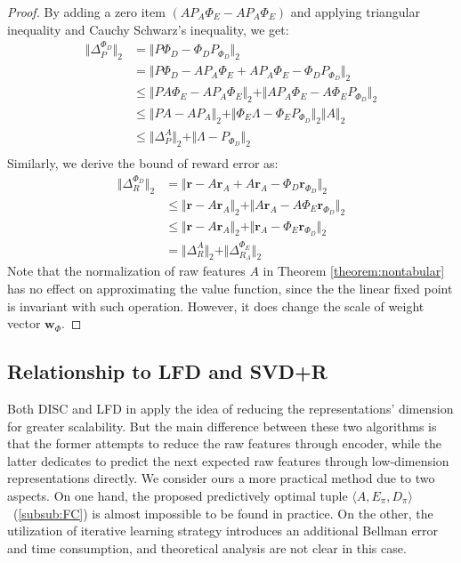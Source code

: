 \documentclass[onecolumn, conference]{IEEEtran}
\begin{document}
\begin{proof}
	 By adding a zero item $(AP_A\Phi_E - AP_A\Phi_E)$ and applying triangular inequality and Cauchy Schwarz's inequality, we get:
	 \begin{align*}
	 	\Vert \Delta_P^{\Phi_D}\Vert_2 & = \Vert P\Phi_D - \Phi_DP_{\Phi_D}\Vert_2\\
	 	& =  \Vert P\Phi_D - AP_A\Phi_E + AP_A\Phi_E - \Phi_DP_{\Phi_D}\Vert_2 \\
	 	& \le \Vert  PA\Phi_E - AP_A\Phi_E\Vert_2 + \Vert AP_A\Phi_E - A\Phi_E P_{\Phi_D}\Vert_2\\
	 	& \le \Vert PA -AP_A\Vert_2 + \Vert \Phi_E \Lambda - \Phi_E P_{\Phi_D}\Vert_2 \Vert A\Vert_2\\
	 	& \le  \Vert \Delta_P^A\Vert_2 + \Vert \Lambda - P_{\Phi_D}\Vert_2\\
	 \end{align*}
	 Similarly, we derive the bound of reward error as:
	 \begin{align*}
	 	\Vert \Delta_R^{\Phi_D}\Vert_2 &= \Vert \boldsymbol{r} - A\boldsymbol{r}_A +A\boldsymbol{r}_A - \Phi_D \boldsymbol{r}_{\Phi_D} \Vert_2\\
	 	&\le \Vert \boldsymbol{r} - A\boldsymbol{r}_A \Vert_2+\Vert A\boldsymbol{r}_A - A\Phi_E \boldsymbol{r}_{\Phi_D} \Vert_2\\
	 	&\le \Vert \boldsymbol{r} - A\boldsymbol{r}_A \Vert_2 + \Vert \boldsymbol{r}_A - \Phi_E \boldsymbol{r}_{\Phi_D} \Vert_2 \\
	 	& = \Vert \Delta_R^{A}\Vert_2 + \Vert \Delta_{R_A}^{\Phi_E} \Vert_2
	 \end{align*}
	 Note that the normalization of raw features $A$ in Theorem \ref{theorem:nontabular} has no effect on approximating the value function, since the the linear fixed point is invariant with such operation. However, it does change the scale of weight vector $\boldsymbol{w}_\Phi$.
\end{proof}

\subsection{Relationship to LFD and SVD+R}
Both DISC and LFD in \cite{Song2016LinearFE} apply the idea of reducing the representations' dimension for greater scalability. But the main difference between these two algorithms is that the former attempts to reduce the raw features through encoder, while the latter dedicates to predict the next expected raw features through low-dimension representations directly. We consider ours a more practical method due to two aspects. On one hand, the proposed predictively optimal tuple $\langle A,E_\pi,D_\pi\rangle$~(\ref{subsub:FC}) is almost impossible to be found in practice. On the other, the utilization of iterative learning strategy introduces an additional Bellman error and time consumption, and theoretical analysis are not clear in this case. 
\end{document}
